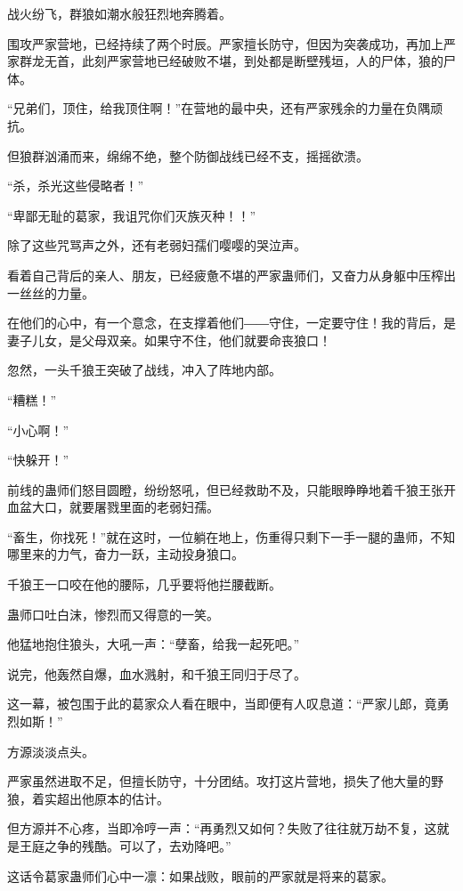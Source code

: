 
\begin{this_body}

战火纷飞，群狼如潮水般狂烈地奔腾着。

围攻严家营地，已经持续了两个时辰。严家擅长防守，但因为突袭成功，再加上严家群龙无首，此刻严家营地已经破败不堪，到处都是断壁残垣，人的尸体，狼的尸体。

“兄弟们，顶住，给我顶住啊！”在营地的最中央，还有严家残余的力量在负隅顽抗。

但狼群汹涌而来，绵绵不绝，整个防御战线已经不支，摇摇欲溃。

“杀，杀光这些侵略者！”

“卑鄙无耻的葛家，我诅咒你们灭族灭种！！”

除了这些咒骂声之外，还有老弱妇孺们嘤嘤的哭泣声。

看着自己背后的亲人、朋友，已经疲惫不堪的严家蛊师们，又奋力从身躯中压榨出一丝丝的力量。

在他们的心中，有一个意念，在支撑着他们――守住，一定要守住！我的背后，是妻子儿女，是父母双亲。如果守不住，他们就要命丧狼口！

忽然，一头千狼王突破了战线，冲入了阵地内部。

“糟糕！”

“小心啊！”

“快躲开！”

前线的蛊师们怒目圆瞪，纷纷怒吼，但已经救助不及，只能眼睁睁地着千狼王张开血盆大口，就要屠戮里面的老弱妇孺。

“畜生，你找死！”就在这时，一位躺在地上，伤重得只剩下一手一腿的蛊师，不知哪里来的力气，奋力一跃，主动投身狼口。

千狼王一口咬在他的腰际，几乎要将他拦腰截断。

蛊师口吐白沫，惨烈而又得意的一笑。

他猛地抱住狼头，大吼一声：“孽畜，给我一起死吧。”

说完，他轰然自爆，血水溅射，和千狼王同归于尽了。

这一幕，被包围于此的葛家众人看在眼中，当即便有人叹息道：“严家儿郎，竟勇烈如斯！”

方源淡淡点头。

严家虽然进取不足，但擅长防守，十分团结。攻打这片营地，损失了他大量的野狼，着实超出他原本的估计。

但方源并不心疼，当即冷哼一声：“再勇烈又如何？失败了往往就万劫不复，这就是王庭之争的残酷。可以了，去劝降吧。”

这话令葛家蛊师们心中一凛：如果战败，眼前的严家就是将来的葛家。


\end{this_body}
